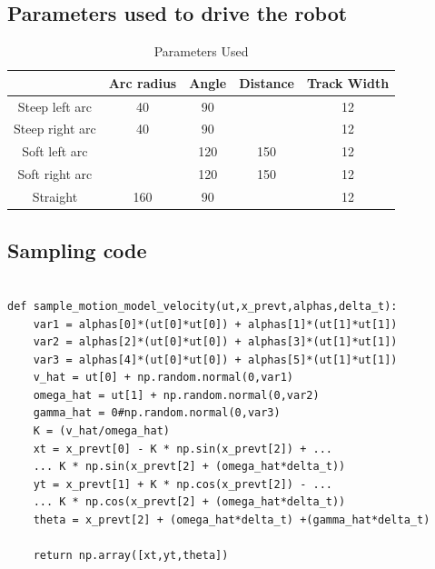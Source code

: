 \documentclass[10pt]{scrartcl}
\begin{document}
\subsection{Parameters used to drive the robot}

\begin{table}[h!]
\centering
\caption{Parameters Used}
\label{tab:1}
\begin{tabular}{|c|c|c|c|c|} \hline
 				& Arc radius& Angle & Distance & Track Width \\ \hline
Steep left arc  & 40        & 90    &          & 12 \\ \hline
Steep right arc & 40        & 90    &          & 12 \\ \hline
Soft left arc   &           & 120    & 150       & 12 \\ \hline
Soft right arc  &           & 120    & 150       & 12 \\ \hline
Straight        & 160        & 90    &          & 12 \\ \hline
 
\end{tabular}
\end{table}

\newpage
\subsection{Sampling code}

\begin{lstlisting}
 
def sample_motion_model_velocity(ut,x_prevt,alphas,delta_t):
    var1 = alphas[0]*(ut[0]*ut[0]) + alphas[1]*(ut[1]*ut[1])
    var2 = alphas[2]*(ut[0]*ut[0]) + alphas[3]*(ut[1]*ut[1])
    var3 = alphas[4]*(ut[0]*ut[0]) + alphas[5]*(ut[1]*ut[1])
    v_hat = ut[0] + np.random.normal(0,var1)
    omega_hat = ut[1] + np.random.normal(0,var2)
    gamma_hat = 0#np.random.normal(0,var3)
    K = (v_hat/omega_hat)
    xt = x_prevt[0] - K * np.sin(x_prevt[2]) + ...
	... K * np.sin(x_prevt[2] + (omega_hat*delta_t))
    yt = x_prevt[1] + K * np.cos(x_prevt[2]) - ...
    ... K * np.cos(x_prevt[2] + (omega_hat*delta_t))
    theta = x_prevt[2] + (omega_hat*delta_t) +(gamma_hat*delta_t)
    
    return np.array([xt,yt,theta])
    
\end{lstlisting}
\end{document}
